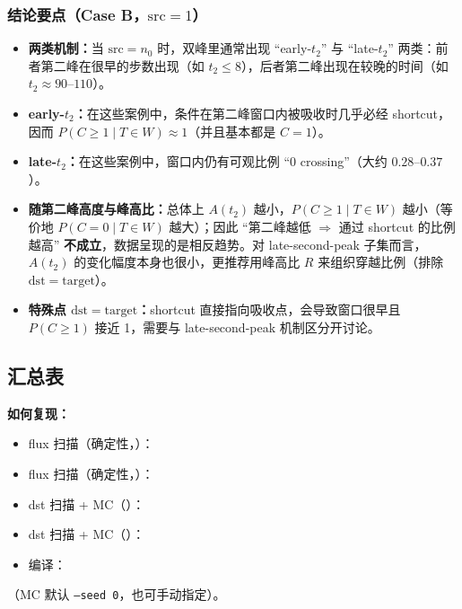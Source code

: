 \documentclass[11pt,fontset=fandol]{ctexart}
\begin{document}
\subsubsection{结论要点（Case B，$\mathrm{src}=1$）}
\begin{itemize}
  \item \textbf{两类机制：}当 $\mathrm{src}=n_0$ 时，双峰里通常出现 ``early-$t_2$'' 与 ``late-$t_2$'' 两类：前者第二峰在很早的步数出现（如 $t_2\le 8$），后者第二峰出现在较晚的时间（如 $t_2\approx 90$--$110$）。
  \item \textbf{early-$t_2$：}在这些案例中，条件在第二峰窗口内被吸收时几乎必经 shortcut，因而 $P(C\ge1\mid T\in W)\approx 1$（并且基本都是 $C=1$）。
  \item \textbf{late-$t_2$：}在这些案例中，窗口内仍有可观比例 ``0 crossing''（大约 $0.28$--$0.37$）。
  \item \textbf{随第二峰高度与峰高比：}总体上 $A(t_2)$ 越小，$P(C\ge1\mid T\in W)$ 越小（等价地 $P(C=0\mid T\in W)$ 越大）；因此 ``第二峰越低 $\Rightarrow$ 通过 shortcut 的比例越高'' \textbf{不成立}，数据呈现的是相反趋势。对 late-second-peak 子集而言，$A(t_2)$ 的变化幅度本身也很小，更推荐用峰高比 $R$ 来组织穿越比例（排除 $\mathrm{dst}=\mathrm{target}$）。
  \item \textbf{特殊点 $\mathrm{dst}=\mathrm{target}$：}shortcut 直接指向吸收点，会导致窗口很早且 $P(C\ge1)$ 接近 1，需要与 late-second-peak 机制区分开讨论。
\end{itemize}

\subsection{汇总表}
{\scriptsize
\centering
\setlength{\tabcolsep}{3pt}
\renewcommand{\arraystretch}{0.85}

\par}

{\footnotesize
\noindent\textbf{如何复现：}
\begin{itemize}[leftmargin=1.6em]
  \item flux 扫描（确定性，）：
  \item flux 扫描（确定性，）：
  \item dst 扫描 + MC（）：
  \item dst 扫描 + MC（）：
  \item 编译：
\end{itemize}
（MC 默认 \texttt{--seed 0}，也可手动指定）。}
\end{document}
